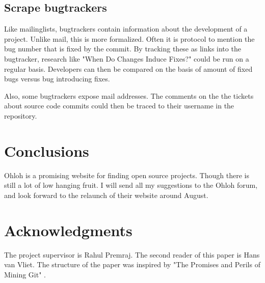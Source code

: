 \documentclass{sig-alternate}
\begin{document}
\subsection{Scrape bugtrackers}
Like mailinglists, bugtrackers contain information about the development of a project. Unlike mail, this is more formalized. Often it is protocol to mention the bug number that is fixed by the commit. By tracking these as links into the bugtracker, research like "When Do Changes Induce Fixes?" \cite{Liwerski:2005p4574} could be run on a regular basis. Developers can then be compared on the basis of amount of fixed bugs versus bug introducing fixes.

Also, some bugtrackers expose mail addresses. The comments on the the tickets about source code commits could then be traced to their username in the repository.


\section{Conclusions}

Ohloh is a promising website for finding open source projects. Though there is still a lot of low hanging fruit. I will send all my suggestions to the Ohloh forum, and look forward to the relaunch of their website around August.


\section{Acknowledgments}
The project supervisor is Rahul Premraj. The second reader of this paper is Hans van Vliet. The structure of the paper was inspired by "The Promises and Perils of Mining Git" \cite{Bird:2009p4462}. 



\end{document}
